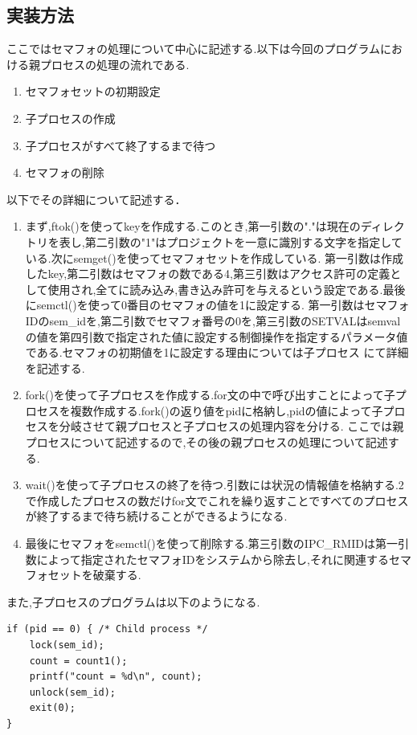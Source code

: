 \documentclass[dvipdfmx]{jarticle}
\begin{document}
\subsection{実装方法}
ここではセマフォの処理について中心に記述する.以下は今回のプログラムにおける親プロセスの処理の流れである.
\begin{enumerate}
    \item セマフォセットの初期設定
    \item 子プロセスの作成
    \item 子プロセスがすべて終了するまで待つ
    \item セマフォの削除
\end{enumerate}
以下でその詳細について記述する．
\begin{enumerate}
    \item まず,ftok()を使ってkeyを作成する.このとき,第一引数の"."は現在のディレクトリを表し,第二引数の"1"はプロジェクトを一意に識別する文字を指定している.\cite{1}次にsemget()を使ってセマフォセットを作成している.
    第一引数は作成したkey,第二引数はセマフォの数である4,第三引数はアクセス許可の定義として使用され,全てに読み込み,書き込み許可を与えるという設定である.\cite{2}最後にsemctl()を使って0番目のセマフォの値を1に設定する.
    第一引数はセマフォIDのsem\_idを,第二引数でセマフォ番号の0を,第三引数のSETVALはsemvalの値を第四引数で指定された値に設定する制御操作を指定するパラメータ値である.セマフォの初期値を1に設定する理由については子プロセス
    にて詳細を記述する.
    \item fork()を使って子プロセスを作成する.for文の中で呼び出すことによって子プロセスを複数作成する.fork()の返り値をpidに格納し,pidの値によって子プロセスを分岐させて親プロセスと子プロセスの処理内容を分ける.
    ここでは親プロセスについて記述するので,その後の親プロセスの処理について記述する.
    \item wait()を使って子プロセスの終了を待つ.引数には状況の情報値を格納する.2で作成したプロセスの数だけfor文でこれを繰り返すことですべてのプロセスが終了するまで待ち続けることができるようになる.\cite{3}
    \item 最後にセマフォをsemctl()を使って削除する.第三引数のIPC\_RMIDは第一引数によって指定されたセマフォIDをシステムから除去し,それに関連するセマフォセットを破棄する.\cite{2}
\end{enumerate}
また,子プロセスのプログラムは以下のようになる.
\begin{lstlisting}
if (pid == 0) { /* Child process */
    lock(sem_id);
    count = count1();
    printf("count = %d\n", count);
    unlock(sem_id);
    exit(0);
}
\end{lstlisting}
\end{document}
